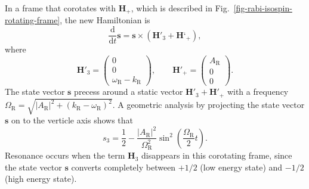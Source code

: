 In a frame that corotates with $\mathbf{H}_+$, which is described in Fig.~\ref{fig-rabi-isospin-rotating-frame}, the new Hamiltonian is
\begin{equation}
\frac{\mathrm d}{\mathrm d t } \mathbf{s} = \mathbf{s} \times (\mathbf{H}'_3 + \mathbf{H}‘_+),
\end{equation}
where
\begin{equation}
\mathbf{H}'_3 = \begin{pmatrix}
    0 \\ 0 \\ 　\omega_{\mathrm{R}} - k_{\mathrm R}
    \end{pmatrix}, \qquad \mathbf{H}'_+ = \begin{pmatrix}
    A_{\mathrm{R}} \\ 0 \\ 　0
    \end{pmatrix}.
\end{equation}
The state vector $\mathbf{s}$ precess around a static vector $\mathbf{H}'_3 + \mathbf{H}'_+$ with a frequency $\Omega_{\mathrm R} = \sqrt{ \lvert A_{\mathrm{R}}\rvert^2 + (k_{\mathrm{R}} - \omega_{\mathrm R})^2 }$. A geometric analysis by projecting the state vector $\mathbf{s}$ on to the verticle axis shows that
\begin{equation}
s_3 = \frac{1}{2} - \frac{\lvert A_{\mathrm R}\rvert ^2}{\Omega_{\mathrm R}^2}\sin^2\left(\frac{\Omega_{\mathrm R}}{2} t\right).
\end{equation}
Resonance occurs when the term $\mathbf{H}_3$ disappears in this corotating frame, since the state vector $\mathbf{s}$ converts completely between $+1/2$ (low energy state) and $-1/2$ (high energy state).



